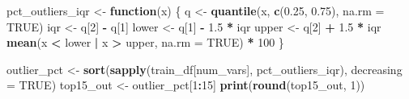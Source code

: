 \documentclass[
]{book}
\newenvironment{Shaded}{\begin{snugshade}}{\end{snugshade}}
\newcommand{\AttributeTok}[1]{\textcolor[rgb]{0.13,0.29,0.53}{#1}}
\newcommand{\ConstantTok}[1]{\textcolor[rgb]{0.56,0.35,0.01}{#1}}
\newcommand{\ControlFlowTok}[1]{\textcolor[rgb]{0.13,0.29,0.53}{\textbf{#1}}}
\newcommand{\DecValTok}[1]{\textcolor[rgb]{0.00,0.00,0.81}{#1}}
\newcommand{\FloatTok}[1]{\textcolor[rgb]{0.00,0.00,0.81}{#1}}
\newcommand{\FunctionTok}[1]{\textcolor[rgb]{0.13,0.29,0.53}{\textbf{#1}}}
\newcommand{\NormalTok}[1]{#1}
\newcommand{\OtherTok}[1]{\textcolor[rgb]{0.56,0.35,0.01}{#1}}
\newcommand{\SpecialCharTok}[1]{\textcolor[rgb]{0.81,0.36,0.00}{\textbf{#1}}}
\begin{document}
\begin{Shaded}
\begin{Highlighting}[]
\NormalTok{pct\_outliers\_iqr }\OtherTok{\textless{}{-}} \ControlFlowTok{function}\NormalTok{(x) \{}
\NormalTok{  q   }\OtherTok{\textless{}{-}} \FunctionTok{quantile}\NormalTok{(x, }\FunctionTok{c}\NormalTok{(}\FloatTok{0.25}\NormalTok{, }\FloatTok{0.75}\NormalTok{), }\AttributeTok{na.rm =} \ConstantTok{TRUE}\NormalTok{)}
\NormalTok{  iqr }\OtherTok{\textless{}{-}}\NormalTok{ q[}\DecValTok{2}\NormalTok{] }\SpecialCharTok{{-}}\NormalTok{ q[}\DecValTok{1}\NormalTok{]}
\NormalTok{  lower }\OtherTok{\textless{}{-}}\NormalTok{ q[}\DecValTok{1}\NormalTok{] }\SpecialCharTok{{-}} \FloatTok{1.5} \SpecialCharTok{*}\NormalTok{ iqr}
\NormalTok{  upper }\OtherTok{\textless{}{-}}\NormalTok{ q[}\DecValTok{2}\NormalTok{] }\SpecialCharTok{+} \FloatTok{1.5} \SpecialCharTok{*}\NormalTok{ iqr}
  \FunctionTok{mean}\NormalTok{(x }\SpecialCharTok{\textless{}}\NormalTok{ lower }\SpecialCharTok{|}\NormalTok{ x }\SpecialCharTok{\textgreater{}}\NormalTok{ upper, }\AttributeTok{na.rm =} \ConstantTok{TRUE}\NormalTok{) }\SpecialCharTok{*} \DecValTok{100}
\NormalTok{\}}

\NormalTok{outlier\_pct }\OtherTok{\textless{}{-}} \FunctionTok{sort}\NormalTok{(}\FunctionTok{sapply}\NormalTok{(train\_df[num\_vars], pct\_outliers\_iqr), }\AttributeTok{decreasing =} \ConstantTok{TRUE}\NormalTok{)}
\NormalTok{top15\_out   }\OtherTok{\textless{}{-}}\NormalTok{ outlier\_pct[}\DecValTok{1}\SpecialCharTok{:}\DecValTok{15}\NormalTok{]}
\FunctionTok{print}\NormalTok{(}\FunctionTok{round}\NormalTok{(top15\_out, }\DecValTok{1}\NormalTok{))}
\end{Highlighting}
\end{Shaded}
\end{document}
